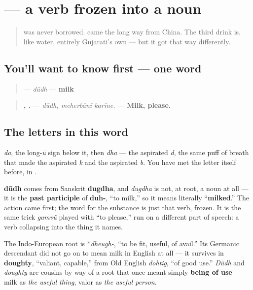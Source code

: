 \section[dūdh]{ — a verb frozen into a noun}

\label{lesson:GU-C10-dudh}



\begin{quote}
\textbf{} was never borrowed. \textbf{} came the long way from China. The third drink is, like water, entirely Gujarati's own — but it got that way differently.
\end{quote}

\subsection*{You'll want to know first — one word}
\begin{quote}
\textbf{} — \emph{dūdh} — \textbf{milk}
\end{quote}

\begin{quote}
\textbf{,  .} — \emph{dūdh, meherbānī karīne.} — \textbf{Milk, please.}
\end{quote}

\subsection*{The letters in this word}
\textbf{} \emph{da}, \textbf{} the long-\emph{ū} sign below it, then \textbf{} \emph{dha} — the aspirated \emph{d}, the same puff of breath that made \textbf{} the aspirated \emph{k} and \textbf{} the aspirated \emph{b}. You have met the letter itself before, in \textbf{ }.

\begin{cousinweb}
\textbf{dūdh} comes from Sanskrit \textbf{dugdha}, and \emph{dugdha} is not, at root, a noun at all — it is the \textbf{past participle} of \textbf{duh-}, \textquotedblleft{}to milk,\textquotedblright{} so it means literally \textquotedblleft{}\textbf{milked}.\textquotedblright{} The action came first; the word for the substance is just that verb, frozen. It is the same trick \emph{gamvũ} played with \textquotedblleft{}to please,\textquotedblright{} run on a different part of speech: a verb collapsing into the thing it names.

The Indo-European root is *\emph{dheugh-}, \textquotedblleft{}to be fit, useful, of avail.\textquotedblright{} Its Germanic descendant did not go on to mean milk in English at all — it survives in \textbf{doughty}, \textquotedblleft{}valiant, capable,\textquotedblright{} from Old English \emph{dohtig}, \textquotedblleft{}of good use.\textquotedblright{} \emph{Dūdh} and \emph{doughty} are cousins by way of a root that once meant simply \textbf{being of use} — milk as \emph{the useful thing}, valor as \emph{the useful person}.
\end{cousinweb}

